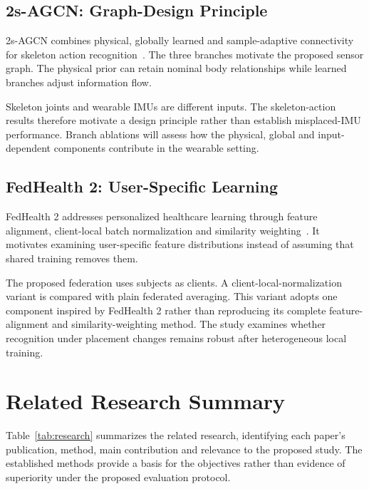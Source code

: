 \documentclass[10pt,a4paper,oneside,openany]{report}
\begin{document}
\subsection{2s-AGCN: Graph-Design Principle}

2s-AGCN combines physical, globally learned and sample-adaptive connectivity for skeleton action recognition~\cite{agcn}. The three branches motivate the proposed sensor graph. The physical prior can retain nominal body relationships while learned branches adjust information flow.

Skeleton joints and wearable IMUs are different inputs. The skeleton-action results therefore motivate a design principle rather than establish misplaced-IMU performance. Branch ablations will assess how the physical, global and input-dependent components contribute in the wearable setting.

\subsection{FedHealth 2: User-Specific Learning}

FedHealth 2 addresses personalized healthcare learning through feature alignment, client-local batch normalization and similarity weighting~\cite{fedhealth}. It motivates examining user-specific feature distributions instead of assuming that shared training removes them.

The proposed federation uses subjects as clients. A client-local-normalization variant is compared with plain federated averaging. This variant adopts one component inspired by FedHealth 2 rather than reproducing its complete feature-alignment and similarity-weighting method. The study examines whether recognition under placement changes remains robust after heterogeneous local training.

\section{Related Research Summary}

Table~\ref{tab:research} summarizes the related research, identifying each paper's publication, method, main contribution and relevance to the proposed study. The established methods provide a basis for the objectives rather than evidence of superiority under the proposed evaluation protocol.
\end{document}
